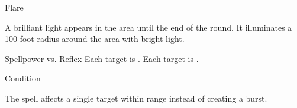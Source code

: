 \begin{spellsection}{Flare}
\begin{spellcontent}
\begin{spelltargetinginfo}
\end{spelltargetinginfo}
\begin{spelleffects}
\spelleffect
A brilliant light appears in the area until the end of the round.
It illuminates a 100 foot radius around the area with bright light.
\begin{spellattack}{Spellpower vs. Reflex}
\spellsuccess
Each target is \dazzled.
\spellcritical
Each target is \blinded.
\end{spellattack}
\spelldur Condition
\end{spelleffects}
\end{spellcontent}
\begin{spellfooter}
\end{spellfooter}
\begin{spellsubcontent}
\begin{spellcantrip}
The spell affects a single target within range instead of creating a burst.
\end{spellcantrip}
\end{spellsubcontent}
\end{spellsection}
